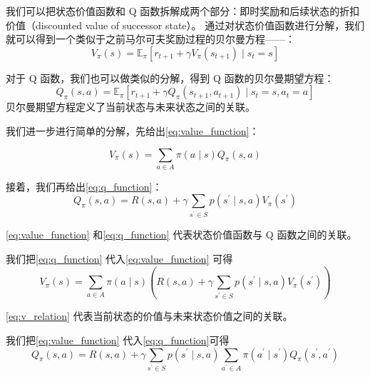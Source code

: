 我们可以把状态价值函数和 Q 函数拆解成两个部分：即时奖励和后续状态的折扣价值（discounted value of successor state）。
通过对状态价值函数进行分解，我们就可以得到一个类似于之前马尔可夫奖励过程的贝尔曼方程------：
\begin{equation}
  V_{\pi}(s)=\mathbb{E}_{\pi}\left[r_{t+1}+\gamma V_{\pi}\left(s_{t+1}\right) \mid s_{t}=s\right] 
  \label{eq:vBEE}
\end{equation}

对于 Q 函数，我们也可以做类似的分解，得到 Q 函数的贝尔曼期望方程：
\begin{equation}
  Q_{\pi}(s, a)=\mathbb{E}_{\pi}\left[r_{t+1}+\gamma Q_{\pi}\left(s_{t+1}, a_{t+1}\right) \mid s_{t}=s, a_{t}=a\right]
  \label{eq:QBEE}
\end{equation}
贝尔曼期望方程定义了当前状态与未来状态之间的关联。

我们进一步进行简单的分解，先给出\eqref{eq:value_function}：

\begin{equation}
  V_{\pi}(s)=\sum_{a \in A} \pi(a \mid s) Q_{\pi}(s, a) 
  \label{eq:value_function}
\end{equation}

接着，我们再给出\eqref{eq:q_function}：
\begin{equation}
  Q_{\pi}(s, a)=R(s,a)+\gamma \sum_{s^{\prime} \in S} p\left(s^{\prime} \mid s, a\right) V_{\pi}\left(s^{\prime}\right) 
  \label{eq:q_function}
\end{equation}

\eqref{eq:value_function} 和\eqref{eq:q_function} 代表状态价值函数与 Q 函数之间的关联。

我们把\eqref{eq:q_function} 代入\eqref{eq:value_function} 可得
\begin{equation}
  V_{\pi}(s)=\sum_{a \in A} \pi(a \mid s)\left(R(s, a)+\gamma \sum_{s^{\prime} \in S} p\left(s^{\prime} \mid s, a\right) V_{\pi}\left(s^{\prime}\right)\right) 
  \label{eq:v_relation}
\end{equation}

\eqref{eq:v_relation} 代表当前状态的价值与未来状态价值之间的关联。

我们把\eqref{eq:value_function}  代入\eqref{eq:q_function}可得
\begin{equation}
  Q_{\pi}(s, a)=R(s, a)+\gamma \sum_{s^{\prime} \in S} p\left(s^{\prime} \mid s, a\right) \sum_{a^{\prime} \in A} \pi\left(a^{\prime} \mid s^{\prime}\right) Q_{\pi}\left(s^{\prime}, a^{\prime}\right) 
  \label{eq:q_relation}
\end{equation}

